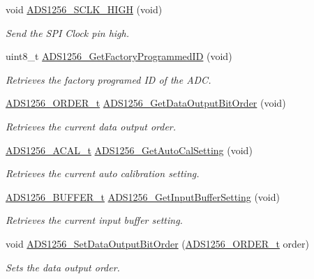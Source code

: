 \begin{DoxyCompactItemize}
void \hyperlink{group__ads1256__driver_ga13b51a0fb626ff6f592fc7ce425e8046}{A\-D\-S1256\-\_\-\-S\-C\-L\-K\-\_\-\-H\-I\-G\-H} (void)
\begin{DoxyCompactList}\small\item\em Send the S\-P\-I Clock pin high. \end{DoxyCompactList}\item 
uint8\-\_\-t \hyperlink{group__ads1256__driver_gaec26aa231ee327bf65220eee6f779b81}{A\-D\-S1256\-\_\-\-Get\-Factory\-Programmed\-I\-D} (void)
\begin{DoxyCompactList}\small\item\em Retrieves the factory programed I\-D of the A\-D\-C. \end{DoxyCompactList}\item 
\hyperlink{group__ads1256__driver_ga3615e2e1ba70971dcdd5f7e54ffe5606}{A\-D\-S1256\-\_\-\-O\-R\-D\-E\-R\-\_\-t} \hyperlink{group__ads1256__driver_ga6f362fc42d375f4aec10bd2115dfd85d}{A\-D\-S1256\-\_\-\-Get\-Data\-Output\-Bit\-Order} (void)
\begin{DoxyCompactList}\small\item\em Retrieves the current data output order. \end{DoxyCompactList}\item 
\hyperlink{group__ads1256__driver_ga17864ca559c443a262068f0d19406113}{A\-D\-S1256\-\_\-\-A\-C\-A\-L\-\_\-t} \hyperlink{group__ads1256__driver_ga3a4dac1ff9bffcccbc561853a9598554}{A\-D\-S1256\-\_\-\-Get\-Auto\-Cal\-Setting} (void)
\begin{DoxyCompactList}\small\item\em Retrieves the current auto calibration setting. \end{DoxyCompactList}\item 
\hyperlink{group__ads1256__driver_ga12f71f8fc93fe63fb3c855ddd2070890}{A\-D\-S1256\-\_\-\-B\-U\-F\-F\-E\-R\-\_\-t} \hyperlink{group__ads1256__driver_gafb6c3c92ef11b050dfa33073e0347a4c}{A\-D\-S1256\-\_\-\-Get\-Input\-Buffer\-Setting} (void)
\begin{DoxyCompactList}\small\item\em Retrieves the current input buffer setting. \end{DoxyCompactList}\item 
void \hyperlink{group__ads1256__driver_ga4131f935614bc1ea9eff4f0ec8b1cdfb}{A\-D\-S1256\-\_\-\-Set\-Data\-Output\-Bit\-Order} (\hyperlink{group__ads1256__driver_ga3615e2e1ba70971dcdd5f7e54ffe5606}{A\-D\-S1256\-\_\-\-O\-R\-D\-E\-R\-\_\-t} order)
\begin{DoxyCompactList}\small\item\em Sets the data output order. \end{DoxyCompactList}\item 

\end{DoxyCompactItemize}
